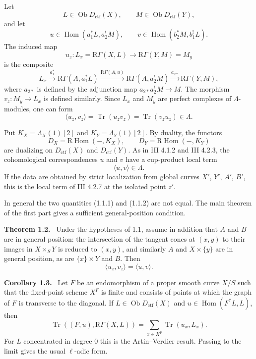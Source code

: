 \documentclass[11pt]{article}
\theoremstyle{plain}
\theoremstyle{definition}
\theoremstyle{remark}
\newenvironment{statement}[1]{\par\medskip\noindent\textbf{#1.}\ }{\par\medskip}
\DeclareMathOperator{\Hom}{Hom}
\DeclareMathOperator{\ob}{Ob}
\DeclareMathOperator{\Tr}{Tr}
\newcommand{\R}{\mathrm R}
\begin{document}
Let
\[
   L\in\ob D_{\mathrm{ctf}}(X),\qquad
   M\in\ob D_{\mathrm{ctf}}(Y),
\]
and let
\[
   u\in\Hom(a_1^*L,a_2^!M),
   \qquad
   v\in\Hom(b_2^*M,b_1^!L).
\]
The induced map
\[
   u_z:L_x=\R\Gamma(X,L)\to \R\Gamma(Y,M)=M_y
\]
is the composite
\[
L_x\xrightarrow{a_1^*}\R\Gamma(A,a_1^*L)
\xrightarrow{\R\Gamma(A,u)}\R\Gamma(A,a_2^!M)
\xrightarrow{a_{2*}}\R\Gamma(Y,M),
\]
where $a_{2*}$ is defined by the adjunction map $a_{2*}a_2^!M\to M$. The morphism $v_z:M_y\to L_x$ is defined similarly. Since $L_x$ and $M_y$ are perfect complexes of $\Lambda$-modules, one can form
\begin{equation}
   \langle u_z,v_z\rangle=
   \Tr(u_zv_z)=\Tr(v_zu_z)\in\Lambda.
   \tag{1.1.1}
\end{equation}

Put $K_X=\Lambda_X(1)[2]$ and $K_Y=\Lambda_Y(1)[2]$. By duality, the functors
\[
   D_X=\R\Hom(-,K_X),
   \qquad
   D_Y=\R\Hom(-,K_Y)
\]
are dualizing on $D_{\mathrm{ctf}}(X)$ and $D_{\mathrm{ctf}}(Y)$. As in III 4.1.2 and III 4.2.3, the cohomological correspondences $u$ and $v$ have a cup-product local term
\begin{equation}
   \langle u,v\rangle\in\Lambda.
   \tag{1.1.2}
\end{equation}
If the data are obtained by strict localization from global curves $X'$, $Y'$, $A'$, $B'$, this is the local term of III 4.2.7 at the isolated point $z'$.

In general the two quantities (1.1.1) and (1.1.2) are not equal. The main theorem of the first part gives a sufficient general-position condition.

\begin{statement}{Theorem 1.2}
Under the hypotheses of 1.1, assume in addition that $A$ and $B$ are in general position: the intersection of the tangent cones at $(x,y)$ to their images in $X\times_S Y$ is reduced to $(x,y)$, and similarly $A$ and $X\times\{y\}$ are in general position, as are $\{x\}\times Y$ and $B$. Then
\begin{equation}
   \langle u_z,v_z\rangle=\langle u,v\rangle.
   \tag{1.2.1}
\end{equation}
\end{statement}

\begin{statement}{Corollary 1.3}
Let $F$ be an endomorphism of a proper smooth curve $X/S$ such that the fixed-point scheme $X^F$ is finite and consists of points at which the graph of $F$ is transverse to the diagonal. If $L\in\ob D_{\mathrm{ctf}}(X)$ and $u\in\Hom(F^*L,L)$, then
\[
   \Tr((F,u),\R\Gamma(X,L))=
   \sum_{x\in X^F}\Tr(u_x,L_x).
\]
For $L$ concentrated in degree $0$ this is the Artin--Verdier result. Passing to the limit gives the usual $\ell$-adic form.
\end{statement}
\end{document}
